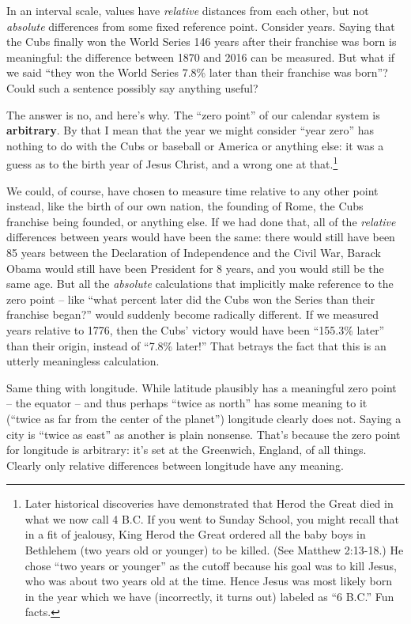 In an interval scale, values have \textit{relative} distances from each other,
but not \textit{absolute} differences from some fixed reference point. Consider
years. Saying that the Cubs finally won the World Series 146 years after their
franchise was born is meaningful: the difference between 1870 and 2016 can be
measured. But what if we said ``they won the World Series 7.8\% later than
their franchise was born''? Could such a sentence possibly say anything useful?

The answer is no, and here's why. The ``zero point'' of our calendar system is
\textbf{arbitrary}. By that I mean that the year we might consider ``year
zero'' has nothing to do with the Cubs or baseball or America or anything else:
it was a guess as to the birth year of Jesus Christ, and a wrong one at
that.\footnote{Later historical discoveries have demonstrated that Herod the
Great died in what we now call 4 B.C. If you went to Sunday School, you might
recall that in a fit of jealousy, King Herod the Great ordered all the baby
boys in Bethlehem (two years old or younger) to be killed. (See Matthew
2:13-18.) He chose ``two years or younger'' as the cutoff because his goal was
to kill Jesus, who was about two years old at the time. Hence Jesus was most
likely born in the year which we have (incorrectly, it turns out) labeled as
``6 B.C.'' Fun facts.}

We could, of course, have chosen to measure time relative to any other point
instead, like the birth of our own nation, the founding of Rome, the Cubs
franchise being founded, or anything else. If we had done that, all of the
\textit{relative} differences between years would have been the same: there
would still have been 85 years between the Declaration of Independence and the
Civil War, Barack Obama would still have been President for 8 years, and you
would still be the same age. But all the \textit{absolute} calculations that
implicitly make reference to the zero point -- like ``what percent later did
the Cubs won the Series than their franchise began?'' would suddenly become
radically different. If we measured years relative to 1776, then the Cubs'
victory would have been ``155.3\% later'' than their origin, instead of ``7.8\%
later!'' That betrays the fact that this is an utterly meaningless calculation.

Same thing with longitude. While latitude plausibly has a meaningful zero point
-- the equator -- and thus perhaps ``twice as north'' has some meaning to it
(``twice as far from the center of the planet'') longitude clearly does not.
Saying a city is ``twice as east'' as another is plain nonsense. That's because
the zero point for longitude is arbitrary: it's set at the Greenwich, England,
of all things. Clearly only relative differences between longitude have any
meaning.

